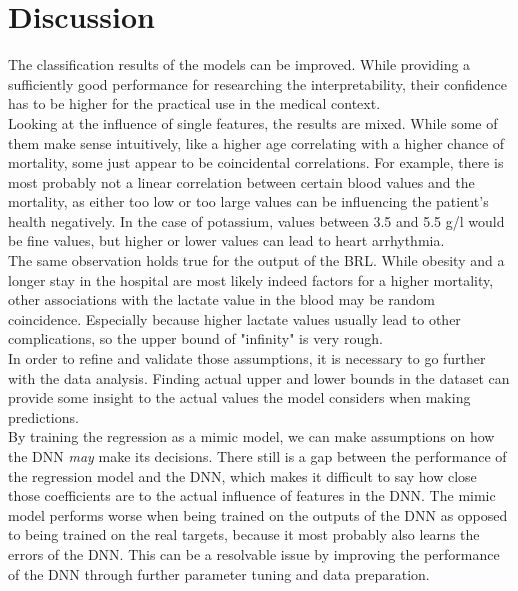 \documentclass[conference,comsoc]{IEEEtran}
\begin{document}
\section{Discussion}
\label{sec:discussion}
The classification results of the models can be improved.
While providing a sufficiently good performance for researching the interpretability, their confidence has to be higher for the practical use in the medical context. \\
Looking at the influence of single features, the results are mixed.
While some of them make sense intuitively, like a higher age correlating with a higher chance of mortality, some just appear to be coincidental correlations.
For example, there is most probably not a linear correlation between certain blood values and the mortality, as either too low or too large values can be influencing the patient's health negatively.
In the case of potassium, values between 3.5 and 5.5 \textmu g/l would be fine values, but higher or lower values can lead to heart arrhythmia. \\
The same observation holds true for the output of the BRL.
While obesity and a longer stay in the hospital are most likely indeed factors for a higher mortality, other associations with the lactate value in the blood may be random coincidence.
Especially because higher lactate values usually lead to other complications, so the upper bound of "infinity" is very rough. \\
In order to refine and validate those assumptions, it is necessary to go further with the data analysis.
Finding actual upper and lower bounds in the dataset can provide some insight to the actual values the model considers when making predictions. \\

By training the regression as a mimic model, we can make assumptions on how the DNN \emph{may} make its decisions.
There still is a gap between the performance of the regression model and the DNN, which makes it difficult to say how close those coefficients are to the actual influence of features in the DNN.
The mimic model performs worse when being trained on the outputs of the DNN as opposed to being trained on the real targets, because it most probably also learns the errors of the DNN.
This can be a resolvable issue by improving the performance of the DNN through further parameter tuning and data preparation.
\end{document}

